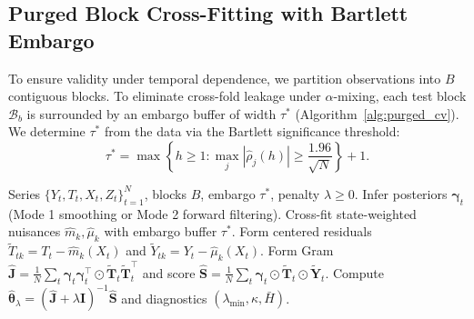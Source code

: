 \documentclass[twoside]{article}
\theoremstyle{definition}
\begin{document}
\subsection{Purged Block Cross-Fitting with Bartlett Embargo}
To ensure validity under temporal dependence, we partition observations into $B$ contiguous blocks. To eliminate cross-fold leakage under $\alpha$-mixing, each test block $\mathcal{B}_b$ is surrounded by an embargo buffer of width $\tau^*$ (Algorithm~\ref{alg:purged_cv}). We determine $\tau^*$ from the data via the Bartlett significance threshold:
\begin{equation}
    \tau^* = \max \left\{ h \ge 1 : \max_{j} \left| \hat{\rho}_j(h) \right| \ge \frac{1.96}{\sqrt{N}} \right\} + 1.
\end{equation}

\begin{algorithm}[t]
\caption{Overlap-Aware Regime DML (OR-DML)}
\label{alg:purged_cv}
\begin{algorithmic}[1]
\REQUIRE Series $\{Y_t, T_t, X_t, Z_t\}_{t=1}^N$, blocks $B$, embargo $\tau^*$, penalty $\lambda \ge 0$.
\STATE Infer posteriors $\boldsymbol{\gamma}_t$ (Mode 1 smoothing or Mode 2 forward filtering).
\STATE Cross-fit state-weighted nuisances $\hat{m}_k, \hat{\mu}_k$ with embargo buffer $\tau^*$.
\STATE Form centered residuals $\tilde{T}_{tk} = T_t - \hat{m}_k(X_t)$ and $\tilde{Y}_{tk} = Y_t - \hat{\mu}_k(X_t)$.
\STATE Form Gram $\hat{\boldsymbol{J}} = \frac{1}{N}\sum_t \boldsymbol{\gamma}_t\boldsymbol{\gamma}_t^\top \odot \tilde{\boldsymbol{T}}_t\tilde{\boldsymbol{T}}_t^\top$ and score $\hat{\boldsymbol{S}} = \frac{1}{N}\sum_t \boldsymbol{\gamma}_t \odot \tilde{\boldsymbol{T}}_t \odot \tilde{\boldsymbol{Y}}_t$.
\STATE Compute $\hat{\boldsymbol{\theta}}_\lambda = (\hat{\boldsymbol{J}} + \lambda \boldsymbol{I})^{-1}\hat{\boldsymbol{S}}$ and diagnostics $(\lambda_{\min}, \kappa, \bar{H})$.
\end{algorithmic}
\end{algorithm}
\end{document}
